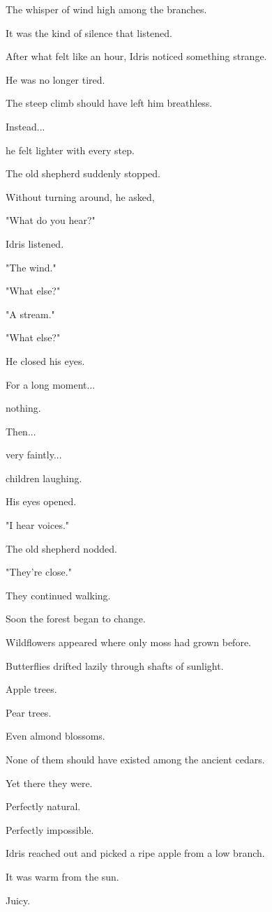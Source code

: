 \documentclass[12pt,openany]{book}
\begin{document}
The whisper of wind high among the branches.

It was the kind of silence that listened.

After what felt like an hour, Idris noticed something strange.

He was no longer tired.

The steep climb should have left him breathless.

Instead...

he felt lighter with every step.

The old shepherd suddenly stopped.

Without turning around, he asked,

"What do you hear?"

Idris listened.

"The wind."

"What else?"

"A stream."

"What else?"

He closed his eyes.

For a long moment...

nothing.

Then...

very faintly...

children laughing.

His eyes opened.

"I hear voices."

The old shepherd nodded.

"They're close."

They continued walking.

Soon the forest began to change.

Wildflowers appeared where only moss had grown before.

Butterflies drifted lazily through shafts of sunlight.

Apple trees.

Pear trees.

Even almond blossoms.

None of them should have existed among the ancient cedars.

Yet there they were.

Perfectly natural.

Perfectly impossible.

Idris reached out and picked a ripe apple from a low branch.

It was warm from the sun.

Juicy.
\end{document}
